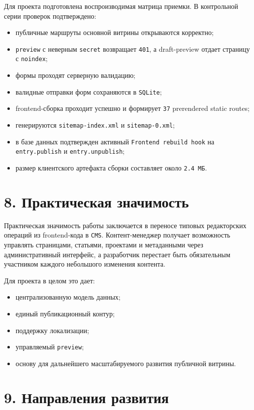 \documentclass[12pt,a4paper]{article}
\begin{document}
Для проекта подготовлена воспроизводимая матрица приемки. В контрольной серии проверок
подтверждено:
\begin{itemize}
  \item публичные маршруты основной витрины открываются корректно;
  \item \texttt{preview} с неверным \texttt{secret} возвращает \texttt{401}, а
  draft-preview отдает страницу с \texttt{noindex};
  \item формы проходят серверную валидацию;
  \item валидные отправки форм сохраняются в \texttt{SQLite};
  \item frontend-сборка проходит успешно и формирует \texttt{37} prerendered static routes;
  \item генерируются \texttt{sitemap-index.xml} и \texttt{sitemap-0.xml};
  \item в базе данных подтвержден активный \texttt{Frontend rebuild hook} на
  \texttt{entry.publish} и \texttt{entry.unpublish};
  \item размер клиентского артефакта сборки составляет около \texttt{2.4 МБ}.
\end{itemize}

\section*{8. Практическая значимость}

Практическая значимость работы заключается в переносе типовых редакторских операций из
frontend-кода в \texttt{CMS}. Контент-менеджер получает возможность управлять страницами,
статьями, проектами и метаданными через административный интерфейс, а разработчик
перестает быть обязательным участником каждого небольшого изменения контента.

Для проекта в целом это дает:
\begin{itemize}
  \item централизованную модель данных;
  \item единый публикационный контур;
  \item поддержку локализации;
  \item управляемый \texttt{preview};
  \item основу для дальнейшего масштабируемого развития публичной витрины.
\end{itemize}

\section*{9. Направления развития}
\end{document}
